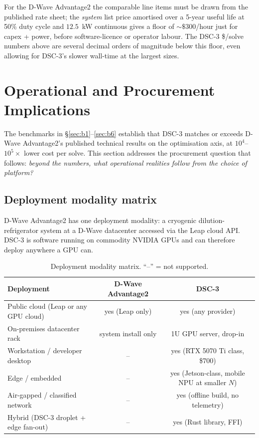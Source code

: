 \documentclass[11pt,a4paper]{article}
\begin{document}
For the D-Wave Advantage2 the comparable line items must be drawn from
the published rate sheet; the \emph{system} list price amortised over a
5-year useful life at 50\% duty cycle and $12.5$~kW continuous gives a
floor of $\sim\$300$/hour just for capex + power, before software-licence
or operator labour. The DSC-3 \$/solve numbers above are
several decimal orders of magnitude below this floor, even allowing for
DSC-3's slower wall-time at the largest sizes.

\section{Operational and Procurement Implications}
\label{sec:operational}

The benchmarks in §\ref{sec:b1}--\ref{sec:b6} establish that DSC-3
matches or exceeds D-Wave Advantage2's published technical results
on the optimisation axis, at $10^{4}$--$10^{5}\times$ lower cost per
solve. This section addresses the procurement question that follows:
\emph{beyond the numbers, what operational realities follow from the
choice of platform?}

\subsection{Deployment modality matrix}
\label{sec:deployment_modality}

D-Wave Advantage2 has one deployment modality: a cryogenic dilution-
refrigerator system at a D-Wave datacenter accessed via the Leap cloud
API. DSC-3 is software running on commodity NVIDIA GPUs and can
therefore deploy anywhere a GPU can.

\begin{table}[h]
\centering
\caption{Deployment modality matrix. ``--'' = not supported.}
\label{tab:deployment_matrix}
\small
\begin{tabular}{lcc}
\toprule
Deployment & D-Wave Advantage2 & DSC-3 \\
\midrule
Public cloud (Leap or any GPU cloud) & yes (Leap only)      & yes (any provider) \\
On-premises datacenter rack          & system install only   & 1U GPU server, drop-in \\
Workstation / developer desktop      & --                    & yes (RTX 5070 Ti class, \$700) \\
Edge / embedded                       & --                    & yes (Jetson-class, mobile NPU at smaller $N$) \\
Air-gapped / classified network      & --                    & yes (offline build, no telemetry) \\
Hybrid (DSC-3 droplet + edge fan-out) & --                    & yes (Rust library, FFI) \\
\bottomrule
\end{tabular}
\end{table}
\end{document}
